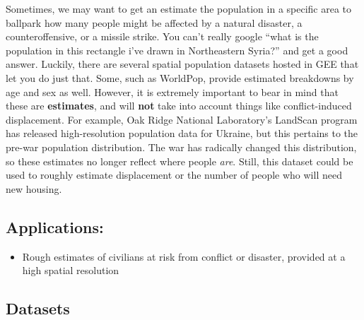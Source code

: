 \documentclass[
  letterpaper,
  DIV=11,
  numbers=noendperiod]{scrreprt}
\providecommand{\tightlist}{%
  \setlength{\itemsep}{0pt}\setlength{\parskip}{0pt}}\usepackage{longtable,booktabs,array}
\begin{document}
Sometimes, we may want to get an estimate the population in a specific
area to ballpark how many people might be affected by a natural
disaster, a counteroffensive, or a missile strike. You can't really
google ``what is the population in this rectangle i've drawn in
Northeastern Syria?'' and get a good answer. Luckily, there are several
spatial population datasets hosted in GEE that let you do just that.
Some, such as WorldPop, provide estimated breakdowns by age and sex as
well. However, it is extremely important to bear in mind that these are
\textbf{estimates}, and will \textbf{not} take into account things like
conflict-induced displacement. For example, Oak Ridge National
Laboratory's LandScan program has released high-resolution population
data for Ukraine, but this pertains to the pre-war population
distribution. The war has radically changed this distribution, so these
estimates no longer reflect where people \emph{are}. Still, this dataset
could be used to roughly estimate displacement or the number of people
who will need new housing.

\hypertarget{applications-6}{%
\subsection*{Applications:}\label{applications-6}}

\begin{itemize}
\tightlist
\item
  Rough estimates of civilians at risk from conflict or disaster,
  provided at a high spatial resolution
\end{itemize}

\hypertarget{datasets-6}{%
\subsection*{Datasets}\label{datasets-6}}
\end{document}
